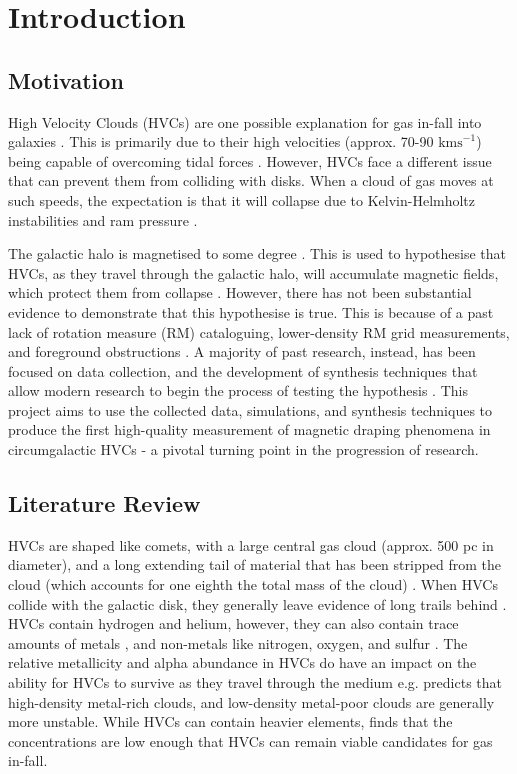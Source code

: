 \chapter{Introduction}
\label{cha:introduction}

\section{Motivation}
\label{sec:motivation}
High Velocity Clouds (HVCs) are one possible explanation for gas in-fall into galaxies \cite{ID7}. This is primarily due to their high velocities (approx. 70-90 $\mathrm{kms}^{-1}$) being capable of overcoming tidal forces \cite{ID7, ID8}. However, HVCs face a different issue that can prevent them from colliding with disks. When a cloud of gas moves at such speeds, the expectation is that it will collapse due to Kelvin-Helmholtz instabilities and ram pressure \cite{ID23, ID33, ID11}.

The galactic halo is magnetised to some degree \cite{ID30}. This is used to hypothesise that HVCs, as they travel through the galactic halo, will accumulate magnetic fields, which protect them from collapse \cite{ID10, ID11, ID13, ID23, ID24, ID34}. However, there has not been substantial evidence to demonstrate that this hypothesise is true. This is because of a past lack of rotation measure (RM) cataloguing, lower-density RM grid measurements, and foreground obstructions \cite{ID2, ID18, ID36}. A majority of past research, instead, has been focused on data collection, and the development of synthesis techniques that allow modern research to begin the process of testing the hypothesis \cite{ID18, ID1, ID3, ID6, ID5, ID30, ID26}. This project aims to use the collected data, simulations, and synthesis techniques to produce the first high-quality measurement of magnetic draping phenomena in circumgalactic HVCs - a pivotal turning point in the progression of research.

\section{Literature Review}
\label{sec:lit-review}

HVCs are shaped like comets, with a large central gas cloud (approx. 500 pc in diameter), and a long extending tail of material that has been stripped from the cloud (which accounts for one eighth the total mass of the cloud) \cite{ID34, ID13}. When HVCs collide with the galactic disk, they generally leave evidence of long trails behind \cite{ID19}. HVCs contain hydrogen and helium, however, they can also contain trace amounts of metals \cite{ID46}, and non-metals like nitrogen, oxygen, and sulfur \cite{ID48, ID49}. The relative metallicity and alpha abundance in HVCs do have an impact on the ability for HVCs to survive as they travel through the medium e.g. \citep{ID24} predicts that high-density metal-rich clouds, and low-density metal-poor clouds are generally more unstable. While HVCs can contain heavier elements, \citep{ID46} finds that the concentrations are low enough that HVCs can remain viable candidates for gas in-fall.


